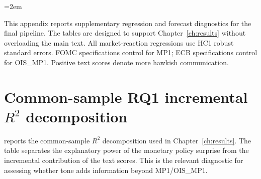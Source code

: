 
\emergencystretch=2em

\providecommand{\sym}[1]{\ensuremath{^{\text{#1}}}}

This appendix reports supplementary regression and forecast diagnostics for the
final pipeline. The tables are designed to support Chapter~\ref{ch:results}
without overloading the main text. All market-reaction regressions use HC1
robust standard errors. FOMC specifications control for MP1; ECB specifications
control for OIS\_MP1. Positive text scores denote more hawkish communication.


\section{Common-sample RQ1 incremental $R^2$ decomposition}
\label{app:a2_common_r2}

 reports the common-sample $R^2$ decomposition
used in Chapter~\ref{ch:results}. The table separates the explanatory power of
the monetary policy surprise from the incremental contribution of the text
scores. This is the relevant diagnostic for assessing whether tone adds
information beyond MP1/OIS\_MP1.

